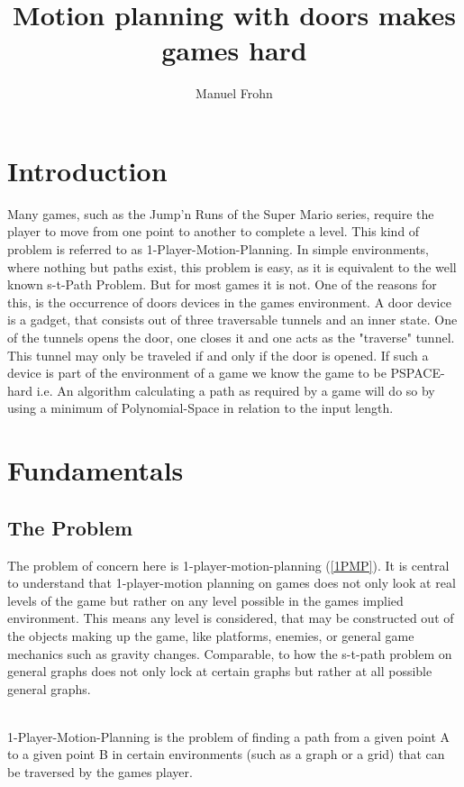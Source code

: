 \documentclass[runningheads]{llncs}
\title{Motion planning with doors makes games hard}
\author{Manuel Frohn}
\institute{RWTH Aachen University, Aachen, Germany\\
\email{manuel.frohn@rwth-aachen.de}}
\begin{document}
\nocite{*}
\maketitle

\newpage

\section{Introduction}
Many games, such as the Jump'n Runs of the Super Mario series, require the
player to move from one point to another to complete a level. This kind of
problem is referred to as 1-Player-Motion-Planning. In simple environments,
where nothing but paths exist, this problem is easy, as it is equivalent to the
well known s-t-Path Problem. But for most games it is not. One of the reasons for
this, is the occurrence of doors devices in the games environment. A door device is
a gadget, that consists out of three traversable tunnels and an inner state. One of
the tunnels opens the door, one closes it and one acts as the "traverse" tunnel. This
tunnel may only be traveled if and only if the door is opened. If such a device is part
of the environment of a game we know the game to be PSPACE-hard i.e. An algorithm calculating
a path as required by a game will do so by using a minimum of Polynomial-Space in relation
to the input length.

\section{Fundamentals}
\subsection{The Problem}
The problem of concern here is 1-player-motion-planning (\ref*{1PMP}). It is central
to understand that 1-player-motion planning on games does not only look at real levels
of the game but rather on any level possible in the games implied environment. This means any
level is considered, that may be constructed out of the objects making up the game, like
platforms, enemies, or general game mechanics such as gravity changes. Comparable, to how the
s-t-path problem on general graphs does not only lock at certain graphs but rather at all
possible general graphs.
\begin{definition}\label{1PMP} \\
  1-Player-Motion-Planning is the problem of finding a path from a given point A to a given
  point B in certain environments (such as a graph or a grid) that can be traversed by the
  games player.
\end{definition}
\end{document}
